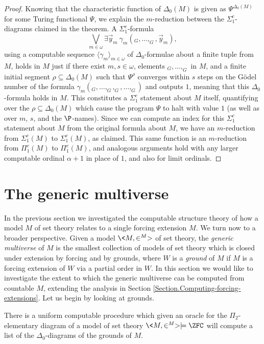 \documentclass{amsart}
\newcommand{\yvec}{\vec{y}}
\begin{document}
 \begin{proof}
 Knowing that the characteristic function of $\Delta_0(M)$ is given as $\Psi^{\Delta_0(M)}$
 for some Turing functional $\Psi$, we explain the $m$-reduction between the $\Sigma_1^c$-diagrams
 claimed in the theorem.  A $\Sigma_1^c$-formula
 $$\bigvee_{m\in\omega} \exists\yvec_m~\gamma_m(_G,\ldots,_G,\yvec_m), $$
 using a computable sequence $\langle\gamma_m\rangle_{m\in\omega}$ of $\Delta_0$-formulae about
 a finite tuple from $M$, holds in $M$ just if there exist $m,s\in\omega$, elements
 $_G,\ldots,_G$ in $M$, and a finite initial segment $\rho\subseteq\Delta_0(M)$
 such that $\Psi^{\rho}$ converges within $s$ steps on the G\"odel number of the formula
 $\gamma_m(_G,\ldots,_G,_G,\ldots,_G)$
 and outputs $1$, meaning that this $\Delta_0$-formula holds in $M$.  This constitutes
 a $\Sigma_1^c$ statement about $M$ itself, quantifying over the $\rho\subseteq\Delta_0(M)$
 which cause the program $\Psi$ to halt with value $1$ (as well as over $m$, $s$, and the $\P$-names).
 Since we can compute an index for this $\Sigma_1^c$ statement about $M$ from the original
 formula about $M$, we have an $m$-reduction from $\Sigma_1^c(M)$ to $\Sigma_1^c(M)$,
 as claimed.  This same function is an $m$-reduction from $\Pi_1^c(M)$ to $\Pi_1^c(M)$,
 and analogous arguments hold with any larger computable ordinal $\alpha+1$ in place of $1$,
 and also for limit ordinals.
 \end{proof}
 
 
 
 \section{The generic multiverse}\label{Section.Generic-multiverse}
 
 In the previous section we investigated the computable structure theory of how a model $M$ of set theory relates to a single forcing extension $M$. We turn now to a broader perspective. Given a model $\<M,\in^M>$ of set theory, the \emph{generic multiverse} of $M$ is the smallest collection of models of set theory which is closed under extension by forcing and by grounds, where $W$ is a \emph{ground} of $M$ if $M$ is a forcing extension of $W$ via a partial order in $W$. In this section we would like to investigate the extent to which the generic multiverse can be computed from countable $M$, extending the analysis in Section \ref{Section.Computing-forcing-extensions}. Let us begin by looking at grounds.
 
 \begin{lemma}\label{Lemma.Computing-grounds}
 There is a uniform computable procedure which given an oracle for the $\Pi_2$-elementary diagram of a model of set theory $\<M,\in^M> \models \ZFC$ will compute a list of the $\Delta_0$-diagrams of the grounds of $M$.
 \end{lemma}
 
\end{document}
